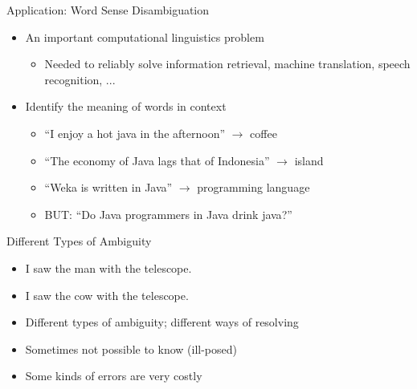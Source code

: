 \documentclass{beamer}
\begin{document}
\begin{frame}{Application: Word Sense Disambiguation}
  \begin{itemize}
  \item An important computational linguistics problem
    \begin{itemize}
      \item Needed to reliably solve information retrieval, machine translation, speech recognition, ...
    \end{itemize}
  \item Identify the meaning of words in context
    \begin{itemize}
      \item ``I enjoy a hot \alert{java} in the afternoon'' $\rightarrow$ \alert{coffee}
      \item ``The economy of \alert{Java} lags that of Indonesia'' $\rightarrow$ \alert{island}
      \item ``Weka is written in \alert{Java}'' $\rightarrow$ \alert{programming language}
      \item BUT: “Do \alert{Java} programmers in \alert{Java} drink \alert{java}?”
    \end{itemize}
  \end{itemize}
\end{frame}



\begin{frame}{Different Types of Ambiguity}

  \begin{itemize}
  \item I saw the man with the telescope.\\
    \hskip 0.2cm
    \hskip 0.2cm
    \hskip 0.2cm
    
  \item I saw the cow with the telescope.\\
    \hskip 0.2cm
  \item Different types of ambiguity; different ways of resolving
  \item Sometimes not possible to know \alert{(ill-posed)}
  \item Some kinds of errors are very costly
  \end{itemize}
  
\end{frame}
\end{document}
